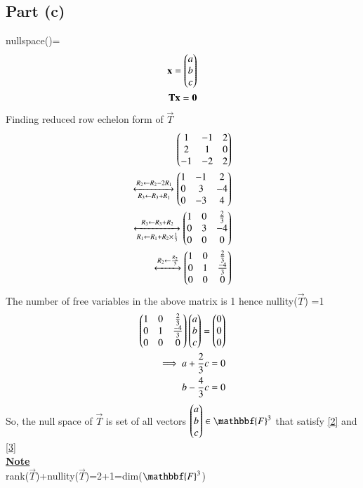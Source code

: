 \documentclass[journal,12pt,twocolumn]{IEEEtran}
\begin{document}
\subsection{Part (c)}
nullspace()=
\begin{align}
\mathbf{x}=\begin{pmatrix}a\\b\\c\end{pmatrix}\\
    \mathbf{T}\mathbf{x}=\mathbf{0}
    \end{align}
    Finding reduced row echelon form of $\vec{T}$
    \begin{align}
    \begin{pmatrix}1&-1&2\\2&1&0\\-1&-2&2\end{pmatrix}\\
    \xleftrightarrow[R_3\leftarrow R_3+R_1]{R_2\leftarrow R_2-2R_1}\begin{pmatrix}1&-1&2\\0&3&-4\\0&-3&4\end{pmatrix}\\\xleftrightarrow[R_1\leftarrow R_1+R_2\times \frac{1}{3}]{R_3\leftarrow R_3+R_2}\begin{pmatrix}1&0&\frac{2}{3}\\0&3&-4\\0&0&0\end{pmatrix}\\
     \xleftrightarrow[]{R_2\leftarrow \frac{R_2}{3}}\begin{pmatrix}1&0&\frac{2}{3}\\0&1&\frac{-4}{3}\\0&0&0\end{pmatrix}
\end{align}
The number of free variables in the above matrix is 1 hence nullity($\vec{T}$) =1\\
\begin{align}
    \begin{pmatrix}1&0&\frac{2}{3}\\0&1&\frac{-4}{3}\\0&0&0\end{pmatrix}\begin{pmatrix}a\\b\\c\end{pmatrix}=\begin{pmatrix}0\\0\\0\end{pmatrix}
    \\\implies a+\frac{2}{3}c=0\label{2}\\b-\frac{4}{3}c=0\label{3}
\end{align}
So, the null space of $\vec{T}$ is set of all vectors $\myvec{a\\b\\c} \in \mathbbf{F}^3$ that satisfy \eqref{2} and \eqref{3}\\
\underline{\textbf{Note}}\\
rank($\vec{T}$)+nullity($\vec{T}$)=2+1=dim($ \mathbbf{F}^3$)
\end{document}
